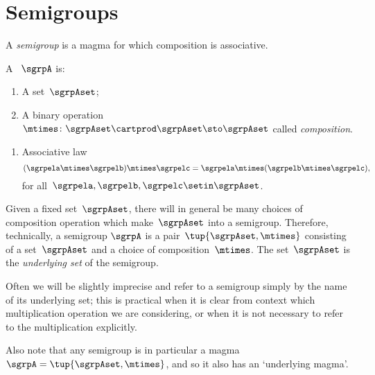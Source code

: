 
\section{Semigroups}
\label{sec:semigroups}

A \emph{semigroup} is a magma for which composition is associative.

\begin{ctdefinition}[Semigroup]
    \label{def:semigroup}
    A \emph{}~$\sgrpA$ is:
    \begin{body}
        \constit
        \begin{enumerate}
            \item A set~$\sgrpAset$;
            \item A binary operation~$\mtimes  \colon \sgrpAset \cartprod \sgrpAset \sto \sgrpAset$ called \emph{composition}.
        \end{enumerate}
        \condit
        \begin{enumerate}
            \item Associative law
                  \begin{equation}
                      \label{eq:semigroup-associative}
                      (\sgrpela \mtimes   \sgrpelb)\mtimes   \sgrpelc
                      = \sgrpela \mtimes   (\sgrpelb \mtimes  \sgrpelc),
                  \end{equation}
                  for all~$\sgrpela , \sgrpelb, \sgrpelc \setin \sgrpAset$.
        \end{enumerate}
    \end{body}
\end{ctdefinition}

\begin{remark}
    Given a fixed set~$\sgrpAset$, there will in general be many choices of composition operation which make~$\sgrpAset$ into a semigroup.
    Therefore, technically, a semigroup $\sgrpA$ is a pair~$\tup{\sgrpAset, \mtimes}$ consisting of a set~$\sgrpAset$ and a choice of composition~$\mtimes$.
    The set~$\sgrpAset$ is the \emph{underlying set} of the semigroup.

    Often we will be slightly imprecise and refer to a semigroup simply by the name of its underlying set;
    this is practical when it is clear from context which multiplication operation we are considering, or when it is not necessary to refer to the multiplication explicitly.

    Also note that any semigroup is in particular a magma~$\sgrpA = \tup{\sgrpAset, \mtimes}$, and so it also has an `underlying magma'.
\end{remark}

